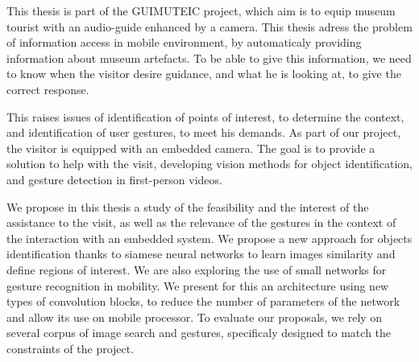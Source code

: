 \justify
This thesis is part of the GUIMUTEIC project, which aim is to equip museum tourist with an audio-guide enhanced by a camera.
This thesis adress the problem of information access in mobile environment, by automaticaly providing information about museum artefacts. 
To be able to give this information, we need to know when the visitor desire guidance, and what he is looking at, to give the correct response.

This raises issues of identification of points of interest, to determine the context, and identification of user gestures, to meet his demands.
As part of our project, the visitor is equipped with an embedded camera.
The goal is to provide a solution to help with the visit, developing vision methods for object identification, and gesture detection in first-person videos.

We propose in this thesis a study of the feasibility and the interest of the assistance to the visit, as well as the relevance of the gestures in the context of the interaction with an embedded system.
We propose a new approach for objects identification thanks to siamese neural networks to learn images similarity and define regions of interest.
We are also exploring the use of small networks for gesture recognition in mobility.
We present for this an architecture using new types of convolution blocks, to reduce the number of parameters of the network and allow its use on mobile processor.
To evaluate our proposals, we rely on several corpus of image search and gestures, specificaly designed to match the constraints of the project.